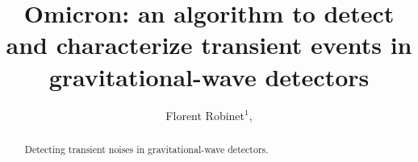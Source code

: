 \documentclass[aps]{revtex4-1}
\begin{document}

\title{Omicron: an algorithm to detect and characterize transient events in gravitational-wave detectors}

\begin{abstract}
  Detecting transient noises in gravitational-wave detectors.
\end{abstract}

\author{
  Florent Robinet$^1$,  
}
        
\address{$^1$LAL, Univ Paris-Sud, CNRS/IN2P3, Orsay, France}

\maketitle









\end{document}
